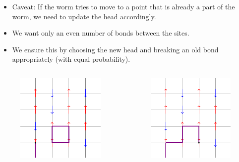 \documentclass{beamer}
\begin{document}
\begin{frame}
\begin{itemize}
    \item Caveat: If the worm tries to move to a point that is already a part of the worm, we need to update the head accordingly.
    \item We want only an even number of bonds between the sites.
    \item We ensure this by choosing the new head and breaking an old bond appropriately (with equal probability).
\end{itemize}
\begin{columns}
\begin{column}{0.5\textwidth}
\begin{figure}
    \centering
    \includegraphics{tikz5.pdf}
\end{figure}
\end{column}
\begin{column}{0.5\textwidth}
\begin{figure}
    \centering
    \includegraphics{tikz6.pdf}
\end{figure}
\end{column}
\end{columns}
\end{frame}
\end{document}
